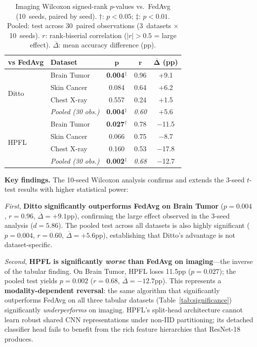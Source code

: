 \documentclass[conference,a4paper]{IEEEtran}
\begin{document}
\begin{table}[htbp]
\centering
\caption{Imaging Wilcoxon signed-rank $p$-values vs.\ FedAvg (10~seeds, paired by seed). $\dagger$: $p < 0.05$; $\ddagger$: $p < 0.01$. Pooled: test across 30~paired observations (3~datasets $\times$ 10~seeds). $r$: rank-biserial correlation ($|r| > 0.5$ = large effect). $\overline{\Delta}$: mean accuracy difference (pp).}
\label{tab:imaging_wilcoxon}
\small
\begin{tabular}{llccc}
\toprule
\textbf{vs FedAvg} & \textbf{Dataset} & $\boldsymbol{p}$ & $\boldsymbol{r}$ & $\boldsymbol{\overline{\Delta}}$ \textbf{(pp)} \\
\midrule
\multirow{4}{*}{Ditto} & Brain Tumor & \textbf{0.004}$^\ddagger$ & 0.96 & $+$9.1 \\
 & Skin Cancer & 0.084 & 0.64 & $+$6.2 \\
 & Chest X-ray & 0.557 & 0.24 & $+$1.5 \\
 & \textit{Pooled (30 obs.)} & \textbf{0.004}$^\ddagger$ & \textit{0.60} & $+$5.6 \\
\midrule
\multirow{4}{*}{HPFL} & Brain Tumor & \textbf{0.027}$^\dagger$ & 0.78 & $-$11.5 \\
 & Skin Cancer & 0.066 & 0.75 & $-$8.7 \\
 & Chest X-ray & 0.160 & 0.53 & $-$17.8 \\
 & \textit{Pooled (30 obs.)} & \textbf{0.002}$^\ddagger$ & \textit{0.68} & $-$12.7 \\
\bottomrule
\end{tabular}
\end{table}

\textbf{Key findings.} The 10-seed Wilcoxon analysis confirms and extends the 3-seed $t$-test results with higher statistical power:

\textit{First}, \textbf{Ditto significantly outperforms FedAvg on Brain Tumor} ($p{=}0.004$, $r{=}0.96$, $\overline{\Delta}{=}{+}9.1$pp), confirming the large effect observed in the 3-seed analysis ($d{=}5.86$). The pooled test across all datasets is also highly significant ($p{=}0.004$, $r{=}0.60$, $\overline{\Delta}{=}{+}5.6$pp), establishing that Ditto's advantage is not dataset-specific.

\textit{Second}, \textbf{HPFL is significantly \textit{worse} than FedAvg on imaging}---the inverse of the tabular finding. On Brain Tumor, HPFL loses 11.5pp ($p{=}0.027$); the pooled test yields $p{=}0.002$ ($r{=}0.68$, $\overline{\Delta}{=}{-}12.7$pp). This represents a \textbf{modality-dependent reversal}: the same algorithm that significantly outperforms FedAvg on all three tabular datasets (Table~\ref{tab:significance}) significantly \textit{underperforms} on imaging. HPFL's split-head architecture cannot learn robust shared CNN representations under non-IID partitioning; its detached classifier head fails to benefit from the rich feature hierarchies that ResNet-18 produces.
\end{document}
